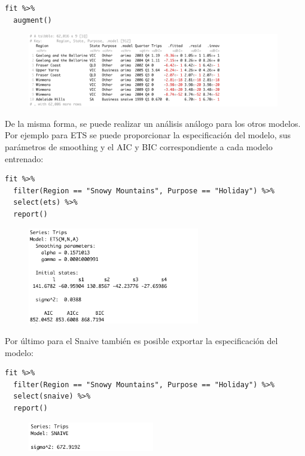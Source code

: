 \begin{lstlisting}
fit %>%
  augment()
\end{lstlisting}


\begin{figure}[!h]
        \includegraphics[width=110mm]{imgs/12_augment.png}
\end{figure}

\newpage

De la misma forma, se puede realizar un análisis análogo para los otros modelos. Por ejemplo para ETS se puede proporcionar la especificación del modelo, sus parámetros de smoothing y el AIC y BIC correspondiente a cada modelo entrenado:

\begin{lstlisting}
fit %>%
  filter(Region == "Snowy Mountains", Purpose == "Holiday") %>%
  select(ets) %>%
  report()
\end{lstlisting}

\begin{figure}[!h]
        \includegraphics[width=75mm]{imgs/06_fit_ets.png}
\end{figure}

Por último para el Snaive también es posible exportar la especificación del modelo: 

\begin{lstlisting}
fit %>%
  filter(Region == "Snowy Mountains", Purpose == "Holiday") %>%
  select(snaive) %>%
  report()
\end{lstlisting}

\begin{figure}[!h]
        \includegraphics[width=55mm]{imgs/07_fit_snaive.png}
\end{figure}

